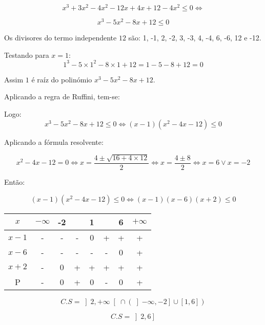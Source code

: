 \documentclass{article}
\begin{document}
    \[x^3+3x^2-4x^2-12x+4x+12-4x^2\leq 0\Leftrightarrow\]

    \[x^3-5x^2-8x+12\leq 0\]

    Os divisores do termo independente \(12\) são: 1, -1, 2, -2, 3, -3, 4, -4, 6, -6, 12 e -12.

    Testando para \(x=1\):
    \[1^3-5\times1^2-8\times1+12=1-5-8+12=0\]

    Assim \(1\) é raíz do polinómio \(x^3-5x^2-8x+12\).

    Aplicando a regra de Ruffini, tem-se:

    \begin{center}
    \end{center}

    Logo:
    \[x^3-5x^2-8x+12\leq 0\Leftrightarrow\left(x-1\right)\left(x^2-4x-12\right)\leq0\]

    Aplicando a fórmula resolvente:

    \[x^2-4x-12=0\Leftrightarrow x=\dfrac{4\pm\sqrt{16+4\times12}}{2}\Leftrightarrow x=\dfrac{4\pm8}{2}\Leftrightarrow x=6\lor x=-2\]

    Então: 

    \[\left(x-1\right)\left(x^2-4x-12\right)\leq0\Leftrightarrow\left(x-1\right)\left(x-6\right)\left(x+2\right)\leq0\]

    \begin{center}
        \begin{tabular}{|c|c|c|c|c|c|c|c|}
        \hline
         $x$   & $-\infty$ & -2 &   & 1 &   & 6 & $+\infty$ \\ \hline
        $x-1$ & -         & -  & - & 0 & + & + & +         \\ \hline
        $x-6$ & -         & -  & - & - & - & 0 & +         \\ \hline
        $x+2$ & -         & 0  & + & + & + & + & +         \\ \hline
        P   & -         & 0  & + & 0 & - & 0 & +         \\ \hline
        \end{tabular}
    \end{center}

    \[C.S=\left]2,+\infty\right[\cap\left(\left]-\infty,-2\right]\cup\left[1,6\right]\right)\]
    
    \begin{center}
    \end{center}

    \[C.S=\left]2,6\right]\]
    
    \begin{center}
    \end{center}
\end{document}

